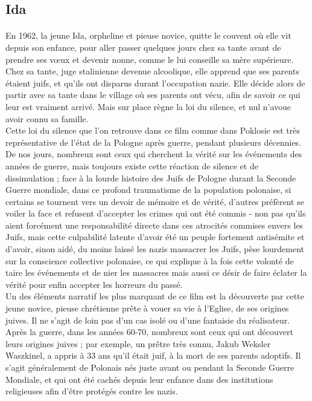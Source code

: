 \documentclass[12pt]{amsart}
\begin{document}
\subsection*{Ida}
\paragraph{}
En 1962, la jeune Ida, orpheline et pieuse novice, quitte le couvent où elle vit depuis son enfance, pour aller passer quelques jours chez sa tante avant de prendre ses vœux et devenir nonne, comme le lui conseille sa mère supérieure. Chez sa tante, juge stalinienne devenue alcoolique, elle apprend que ses parents étaient juifs, et qu'ils ont disparus durant l’occupation nazie. Elle décide alors de partir avec sa tante dans le village où ses parents ont vécu, afin de savoir ce qui leur est vraiment arrivé. Mais sur place règne la loi du silence, et nul n’avoue avoir connu sa famille. \\
Cette loi du silence que l'on retrouve dans ce film comme dans Poklosie est très représentative de l'état de la Pologne après guerre, pendant plusieurs décennies. De nos jours, nombreux sont ceux qui cherchent la vérité sur les événements des années de guerre, mais toujours existe cette réaction de silence et de dissimulation ; face à la lourde histoire des Juifs de Pologne durant la Seconde Guerre mondiale, dans ce profond traumatisme de la population polonaise, si certains se tournent vers un devoir de mémoire et de vérité, d'autres préfèrent se voiler la face et refusent d'accepter les crimes qui ont été commis - non pas qu'ils aient forcément une responsabilité directe dans ces atrocités commises envers les Juifs, mais cette culpabilité latente d'avoir été un peuple fortement antisémite et d'avoir, sinon aidé, du moins laissé les nazis massacrer les Juifs, pèse lourdement sur la conscience collective polonaise, ce qui explique à la fois cette volonté de taire les événements et de nier les massacres mais aussi ce désir de faire éclater la vérité pour enfin accepter les horreurs du passé.\\
Un des éléments narratif les plus marquant de ce film est la découverte par cette jeune novice, pieuse chrétienne prête à vouer sa vie à l'Eglise, de ses origines juives. Il ne s'agit de loin pas d'un cas isolé ou d'une fantaisie du réalisateur. Après la guerre, dans les années 60-70, nombreux sont ceux qui ont découvert leurs origines juives ; par exemple, un prêtre très connu, Jakub Weksler Waszkinel, a appris à 33 ans qu'il était juif, à la mort de ses parents adoptifs. Il s'agit généralement de Polonais nés juste avant ou pendant la Seconde Guerre Mondiale, et qui ont été cachés depuis leur enfance dans des institutions religieuses afin d'être protégés contre les nazis. \\
\end{document}
